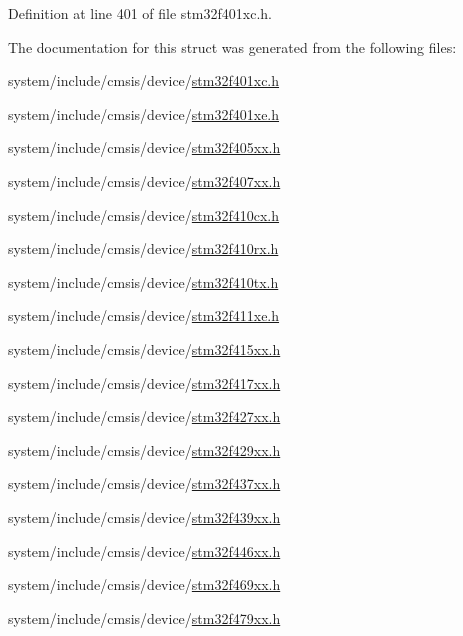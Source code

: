 Definition at line 401 of file stm32f401xc.\+h.



The documentation for this struct was generated from the following files\+:\begin{DoxyCompactItemize}
\item 
system/include/cmsis/device/\hyperlink{stm32f401xc_8h}{stm32f401xc.\+h}\item 
system/include/cmsis/device/\hyperlink{stm32f401xe_8h}{stm32f401xe.\+h}\item 
system/include/cmsis/device/\hyperlink{stm32f405xx_8h}{stm32f405xx.\+h}\item 
system/include/cmsis/device/\hyperlink{stm32f407xx_8h}{stm32f407xx.\+h}\item 
system/include/cmsis/device/\hyperlink{stm32f410cx_8h}{stm32f410cx.\+h}\item 
system/include/cmsis/device/\hyperlink{stm32f410rx_8h}{stm32f410rx.\+h}\item 
system/include/cmsis/device/\hyperlink{stm32f410tx_8h}{stm32f410tx.\+h}\item 
system/include/cmsis/device/\hyperlink{stm32f411xe_8h}{stm32f411xe.\+h}\item 
system/include/cmsis/device/\hyperlink{stm32f415xx_8h}{stm32f415xx.\+h}\item 
system/include/cmsis/device/\hyperlink{stm32f417xx_8h}{stm32f417xx.\+h}\item 
system/include/cmsis/device/\hyperlink{stm32f427xx_8h}{stm32f427xx.\+h}\item 
system/include/cmsis/device/\hyperlink{stm32f429xx_8h}{stm32f429xx.\+h}\item 
system/include/cmsis/device/\hyperlink{stm32f437xx_8h}{stm32f437xx.\+h}\item 
system/include/cmsis/device/\hyperlink{stm32f439xx_8h}{stm32f439xx.\+h}\item 
system/include/cmsis/device/\hyperlink{stm32f446xx_8h}{stm32f446xx.\+h}\item 
system/include/cmsis/device/\hyperlink{stm32f469xx_8h}{stm32f469xx.\+h}\item 
system/include/cmsis/device/\hyperlink{stm32f479xx_8h}{stm32f479xx.\+h}\end{DoxyCompactItemize}

